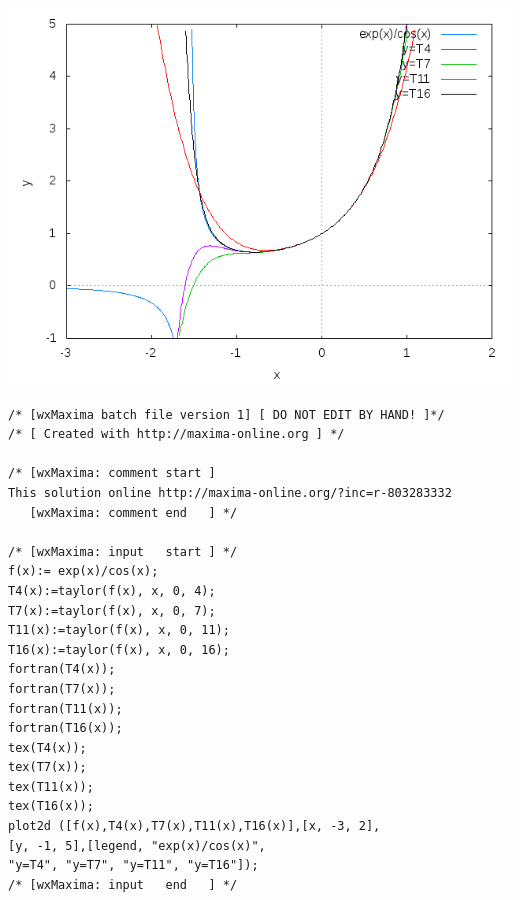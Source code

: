 \documentclass{article}
\begin{document}
\includegraphics[scale=.5]{exp_cos}

\begin{Verbatim}[frame=single]
/* [wxMaxima batch file version 1] [ DO NOT EDIT BY HAND! ]*/
/* [ Created with http://maxima-online.org ] */

/* [wxMaxima: comment start ]
This solution online http://maxima-online.org/?inc=r-803283332
   [wxMaxima: comment end   ] */

/* [wxMaxima: input   start ] */
f(x):= exp(x)/cos(x);
T4(x):=taylor(f(x), x, 0, 4);
T7(x):=taylor(f(x), x, 0, 7);
T11(x):=taylor(f(x), x, 0, 11);
T16(x):=taylor(f(x), x, 0, 16);
fortran(T4(x));
fortran(T7(x));
fortran(T11(x));
fortran(T16(x));
tex(T4(x));
tex(T7(x));
tex(T11(x));
tex(T16(x));
plot2d ([f(x),T4(x),T7(x),T11(x),T16(x)],[x, -3, 2],
[y, -1, 5],[legend, "exp(x)/cos(x)", 
"y=T4", "y=T7", "y=T11", "y=T16"]);
/* [wxMaxima: input   end   ] */
\end{Verbatim}
\end{document}
